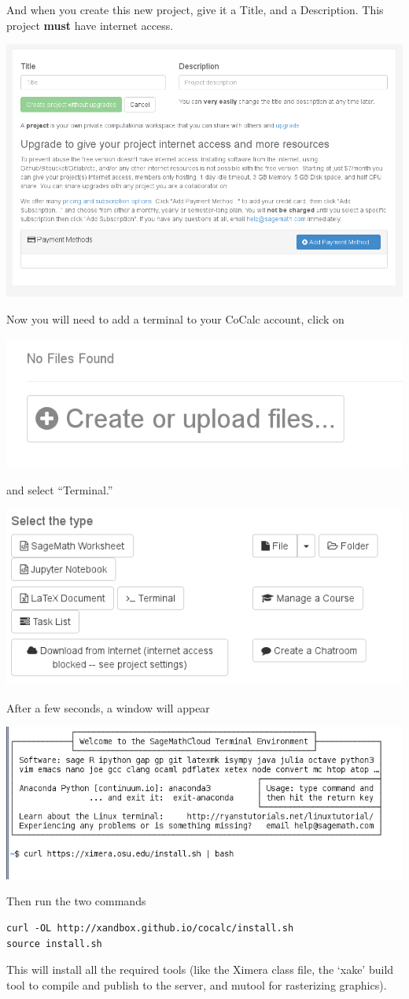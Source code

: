 \documentclass{ximera}
\begin{document}
And when you create this new project, give it a Title, and a
Description. This project \textbf{must} have internet access.
\begin{image}
  \includegraphics{internet.png}
\end{image}
Now you will need to add a terminal to your CoCalc account, click on
\begin{image}
  \includegraphics{create.png}
\end{image}
and select ``Terminal.'' 
\begin{image}
  \includegraphics{type.png}
\end{image}
After a few seconds, a window will appear
\begin{image}
  \includegraphics{typingCurl.png}
\end{image}
Then run the two commands
\begin{verbatim}
curl -OL http://xandbox.github.io/cocalc/install.sh
source install.sh

\end{verbatim}
This will install all the required tools (like the Ximera class file,
the `xake' build tool to compile and publish to the server, and mutool
for rasterizing graphics).
\end{document}
